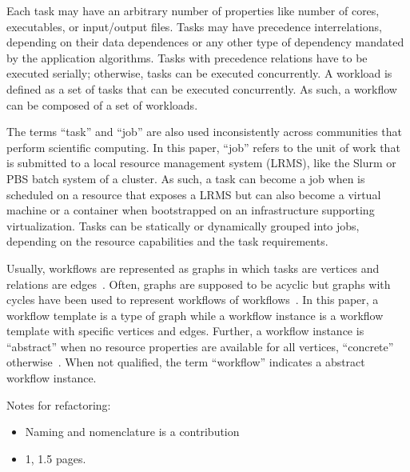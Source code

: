 Each task may have an arbitrary number of properties like number of cores,
executables, or input/output files. Tasks may have precedence interrelations,
depending on their data dependences or any other type of dependency mandated
by the application algorithms. Tasks with precedence relations have to be
executed serially; otherwise, tasks can be executed concurrently. A workload is
defined as a set of tasks that can be executed concurrently. As such, a
workflow can be composed of a set of workloads.

The terms ``task'' and ``job'' are also used inconsistently across communities
that perform scientific computing. In this paper, ``job'' refers to the unit of
work that is submitted to a local resource management system (LRMS), like the
Slurm or PBS batch system of a cluster. As such, a task can become a job when
is scheduled on a resource that exposes a LRMS but can also become a virtual
machine or a container when bootstrapped on an infrastructure supporting
virtualization. Tasks can be statically or dynamically grouped into jobs,
depending on the resource capabilities and the task requirements.

Usually, workflows are represented as graphs in which tasks are vertices and
relations are edges~\cite{}. Often, graphs are supposed to be acyclic but graphs
with cycles have been used to represent workflows of workflows~\cite{}. In this
paper, a workflow template is a type of graph while a workflow instance is a
workflow template with specific vertices and edges. Further, a workflow instance
is ``abstract'' when no resource properties are available for all vertices,
``concrete'' otherwise~\cite{}. When not qualified, the term ``workflow''
indicates a abstract workflow instance.

Notes for refactoring:
\begin{itemize}
    \item Naming and nomenclature is a contribution
    \item 1, 1.5 pages.
\end{itemize}
